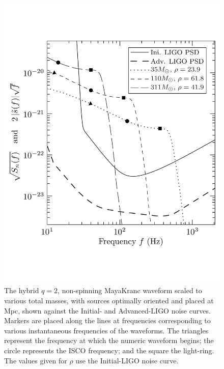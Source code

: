 \begin{figure}
    \includegraphics[width=\linewidth]{figures/ninja2/StildesAndInitialPSD}
  \caption[Hybrid MayaKranc waveform scaled to various total masses]{
  \label{fig:Ninja2StildesAndInitialPSD}
    The hybrid $q=2$, non-spinning MayaKranc waveform scaled to various total
    masses, with sources optimally oriented and placed at
    \unit[100]{Mpc}, shown against the Initial- and Advanced-LIGO
    noise curves.  Markers are placed along the lines at frequencies
    corresponding to various instantaneous frequencies of the
    waveforms.  The triangles represent the frequency at which the
    numeric waveform begins; the circle represents the ISCO frequency;
    and the square the light-ring.  The values given for $\rho$ use
    the Initial-LIGO noise curve.}
\end{figure}%

